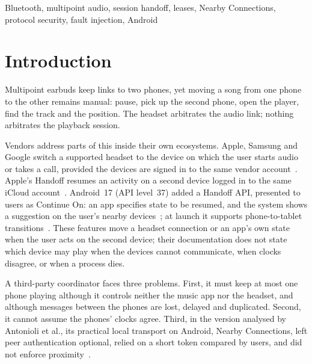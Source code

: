 \documentclass[conference]{IEEEtran}
\begin{document}
\begin{IEEEkeywords}
Bluetooth, multipoint audio, session handoff, leases, Nearby Connections, protocol security, fault injection, Android
\end{IEEEkeywords}

\section{Introduction}

Multipoint earbuds keep links to two phones, yet moving a song from one phone to the other remains manual: pause, pick up the second phone, open the player, find the track and the position. The headset arbitrates the audio link; nothing arbitrates the playback session.

Vendors address parts of this inside their own ecosystems. Apple, Samsung and Google switch a supported headset to the device on which the user starts audio or takes a call, provided the devices are signed in to the same vendor account~\cite{applesw,samsungsw,googlesw}. Apple's Handoff resumes an activity on a second device logged in to the same iCloud account~\cite{stute2021}. Android~17 (API level~37) added a Handoff API, presented to users as Continue On: an app specifies state to be resumed, and the system shows a suggestion on the user's nearby devices~\cite{android17,continueon}; at launch it supports phone-to-tablet transitions~\cite{continueon}. These features move a headset connection or an app's own state when the user acts on the second device; their documentation does not state which device may play when the devices cannot communicate, when clocks disagree, or when a process dies.

A third-party coordinator faces three problems. First, it must keep at most one phone playing although it controls neither the music app nor the headset, and although messages between the phones are lost, delayed and duplicated. Second, it cannot assume the phones' clocks agree. Third, in the version analysed by Antonioli et al., its practical local transport on Android, Nearby Connections, left peer authentication optional, relied on a short token compared by users, and did not enforce proximity~\cite{antonioli2019}.
\end{document}
